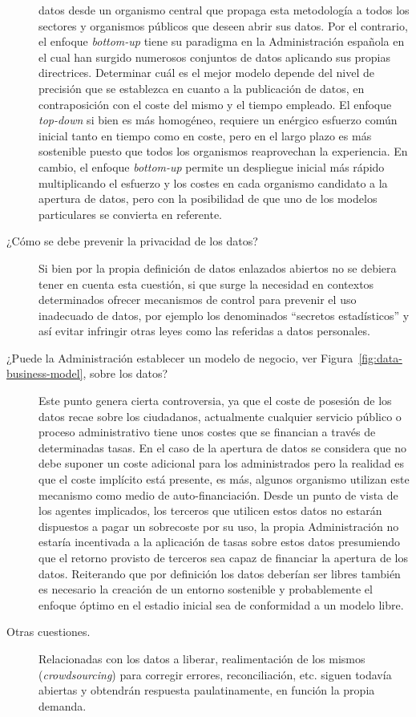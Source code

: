 \begin{description}
datos desde un organismo central que propaga esta metodología a todos los sectores y organismos públicos que deseen abrir sus datos. Por el contrario,
el enfoque \textit{bottom-up} tiene su paradigma en la Administración española en el cual han surgido numerosos conjuntos de datos aplicando
sus propias directrices. Determinar cuál es el mejor modelo depende del nivel de precisión que se establezca en cuanto a la publicación de datos, en contraposición
con el coste del mismo y el tiempo empleado. El enfoque \textit{top-down} si bien es más homogéneo, requiere un enérgico esfuerzo común inicial tanto en tiempo
como en coste, pero en el largo plazo es más sostenible puesto que todos los organismos reaprovechan la experiencia. En cambio, el enfoque \textit{bottom-up} permite
un despliegue inicial más rápido multiplicando el esfuerzo y los costes en cada organismo candidato a la apertura de datos, pero 
con la posibilidad de que uno de los modelos particulares se convierta en referente.
\item [¿Cómo se debe prevenir la privacidad de los datos?] Si bien por la propia definición de datos enlazados abiertos no se debiera tener
en cuenta esta cuestión, si que surge la necesidad en contextos determinados ofrecer mecanismos de control para prevenir el uso inadecuado
de datos, por ejemplo los denominados ``secretos estadísticos'' y así evitar infringir otras leyes como las referidas a datos personales.
\item [¿Puede la Administración establecer un modelo de negocio, ver Figura~\ref{fig:data-business-model}, sobre los datos?] Este punto genera cierta controversia, ya que el coste de posesión 
de los datos recae sobre los ciudadanos, actualmente cualquier servicio público o proceso administrativo tiene unos costes que se financian
a través de determinadas tasas. En el caso de la apertura de datos se considera que no debe suponer un coste adicional para los administrados
pero la realidad es que el coste implícito está presente, es más, algunos organismo utilizan este mecanismo como medio de auto-financiación. Desde un punto
de vista de los agentes implicados, los terceros que utilicen estos datos no estarán dispuestos a pagar un sobrecoste por su uso, la propia Administración
no estaría incentivada a la aplicación de tasas sobre estos datos presumiendo que el retorno provisto de terceros sea capaz de financiar la apertura de los datos. Reiterando que 
por definición los datos deberían ser libres también es necesario la creación de un entorno sostenible y probablemente el enfoque óptimo en el 
estadio inicial sea de conformidad a un modelo libre.
\item [Otras cuestiones.] Relacionadas con los datos a liberar, realimentación de los mismos (\textit{crowdsourcing}) para corregir errores, reconciliación, etc. siguen todavía abiertas y obtendrán respuesta paulatinamente, en función la propia demanda.
\end{description}

